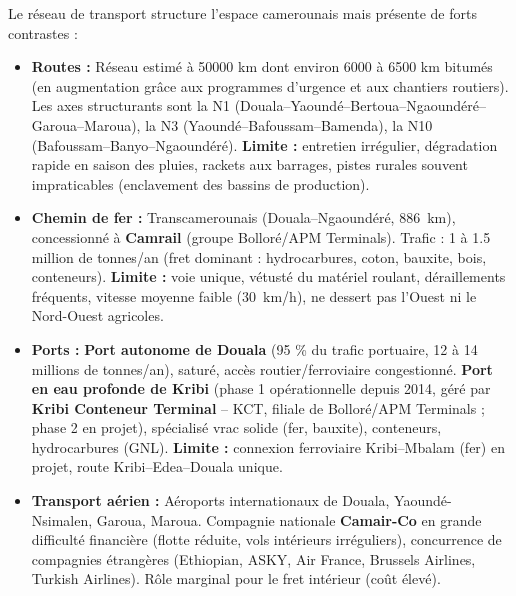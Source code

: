 \documentclass[11pt]{article}
\newcommand{\cle}[1]{{\popxbold\color{popdark}#1}}
\begin{document}
\begin{propriete}
Le réseau de transport structure l'espace camerounais mais présente de forts contrastes :
\begin{itemize}
\item \textbf{Routes :} Réseau estimé à \num{50000} km dont environ \num{6000} à \num{6500} km bitumés (en augmentation grâce aux programmes d'urgence et aux chantiers routiers). Les axes structurants sont la N1 (Douala--Yaoundé--Bertoua--Ngaoundéré--Garoua--Maroua), la N3 (Yaoundé--Bafoussam--Bamenda), la N10 (Bafoussam--Banyo--Ngaoundéré). \textbf{Limite :} entretien irrégulier, dégradation rapide en saison des pluies, rackets aux barrages, pistes rurales souvent impraticables (enclavement des bassins de production).
\item \textbf{Chemin de fer :} \cle{Transcamerounais} (Douala--Ngaoundéré, \SI{886}{km}), concessionné à \textbf{Camrail} (groupe Bolloré/APM Terminals). Trafic : \num{1} à \num{1,5} million de tonnes/an (fret dominant : hydrocarbures, coton, bauxite, bois, conteneurs). \textbf{Limite :} voie unique, vétusté du matériel roulant, déraillements fréquents, vitesse moyenne faible (\SI{30}{km/h}), ne dessert pas l'Ouest ni le Nord-Ouest agricoles.
\item \textbf{Ports :} \textbf{Port autonome de Douala} (95 \% du trafic portuaire, \num{12} à \num{14} millions de tonnes/an), saturé, accès routier/ferroviaire congestionné. \textbf{Port en eau profonde de Kribi} (phase 1 opérationnelle depuis 2014, géré par \textbf{Kribi Conteneur Terminal} -- KCT, filiale de Bolloré/APM Terminals ; phase 2 en projet), spécialisé vrac solide (fer, bauxite), conteneurs, hydrocarbures (GNL). \textbf{Limite :} connexion ferroviaire Kribi--Mbalam (fer) en projet, route Kribi--Edea--Douala unique.
\item \textbf{Transport aérien :} Aéroports internationaux de Douala, Yaoundé-Nsimalen, Garoua, Maroua. Compagnie nationale \textbf{Camair-Co} en grande difficulté financière (flotte réduite, vols intérieurs irréguliers), concurrence de compagnies étrangères (Ethiopian, ASKY, Air France, Brussels Airlines, Turkish Airlines). Rôle marginal pour le fret intérieur (coût élevé).
\end{itemize}
\end{propriete}
\end{document}
